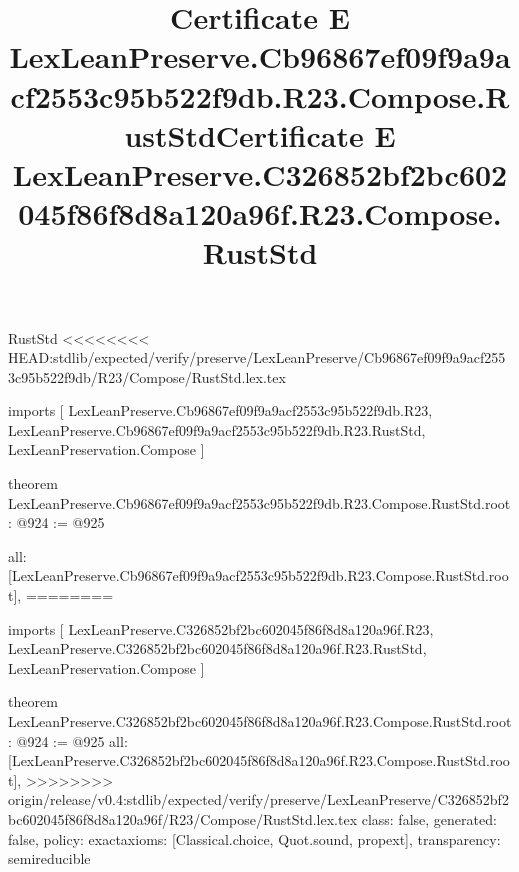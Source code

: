 \begin{lexlean}{RustStd}
<<<<<<<< HEAD:stdlib/expected/verify/preserve/LexLeanPreserve/Cb96867ef09f9a9acf2553c95b522f9db/R23/Compose/RustStd.lex.tex
\title{Certificate E LexLeanPreserve.Cb96867ef09f9a9acf2553c95b522f9db.R23.Compose.RustStd}
\begin{coremodule}
imports [
  LexLeanPreserve.Cb96867ef09f9a9acf2553c95b522f9db.R23,
  LexLeanPreserve.Cb96867ef09f9a9acf2553c95b522f9db.R23.RustStd,
  LexLeanPreservation.Compose
]

theorem LexLeanPreserve.Cb96867ef09f9a9acf2553c95b522f9db.R23.Compose.RustStd.root : @924 := @925 {
  all: [LexLeanPreserve.Cb96867ef09f9a9acf2553c95b522f9db.R23.Compose.RustStd.root],
========
\title{Certificate E LexLeanPreserve.C326852bf2bc602045f86f8d8a120a96f.R23.Compose.RustStd}
\begin{coremodule}
imports [
  LexLeanPreserve.C326852bf2bc602045f86f8d8a120a96f.R23,
  LexLeanPreserve.C326852bf2bc602045f86f8d8a120a96f.R23.RustStd,
  LexLeanPreservation.Compose
]

theorem LexLeanPreserve.C326852bf2bc602045f86f8d8a120a96f.R23.Compose.RustStd.root : @924 := @925 {
  all: [LexLeanPreserve.C326852bf2bc602045f86f8d8a120a96f.R23.Compose.RustStd.root],
>>>>>>>> origin/release/v0.4:stdlib/expected/verify/preserve/LexLeanPreserve/C326852bf2bc602045f86f8d8a120a96f/R23/Compose/RustStd.lex.tex
  class: false,
  generated: false,
  policy: exact{axioms: [Classical.choice, Quot.sound, propext]},
  transparency: semireducible
}


\end{coremodule}}
\end{coremodule}
\end{lexlean}
